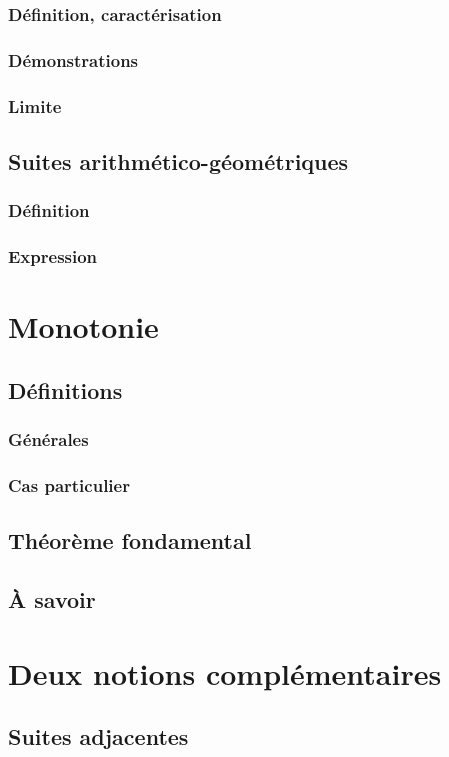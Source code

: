 \documentclass[12pt,a4paper,french]{book}
\begin{document}
			\subsubsection{Définition, caractérisation}
			\subsubsection{Démonstrations}
			\subsubsection{Limite}
		\subsection{Suites arithmético-géométriques}
			\subsubsection{Définition}
			\subsubsection{Expression}
	\section{Monotonie}
		\subsection{Définitions}
			\subsubsection{Générales}
			\subsubsection{Cas particulier}
		\subsection{Théorème fondamental}
		\subsection{À savoir}
	\section{Deux notions complémentaires}
		\subsection{Suites adjacentes}
\end{document}
